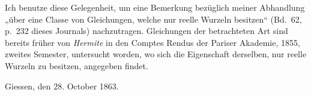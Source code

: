 \documentclass{article}
\begin{document}
Ich benutze diese Gelegenheit, um eine Bemerkung bezüglich meiner Abhandlung „über eine Classe von Gleichungen, welche nur reelle Wurzeln besitzen“ (Bd.\ 62, p.\ 232 dieses Journals) nachzutragen. Gleichungen der betrachteten Art sind bereits früher von \emph{Hermite} in den Comptes Rendus der Pariser Akademie, 1855, zweites Semester, untersucht worden, wo sich die Eigenschaft derselben, nur reelle Wurzeln zu besitzen, angegeben findet.

Giessen, den 28. October 1863.
\end{document}
